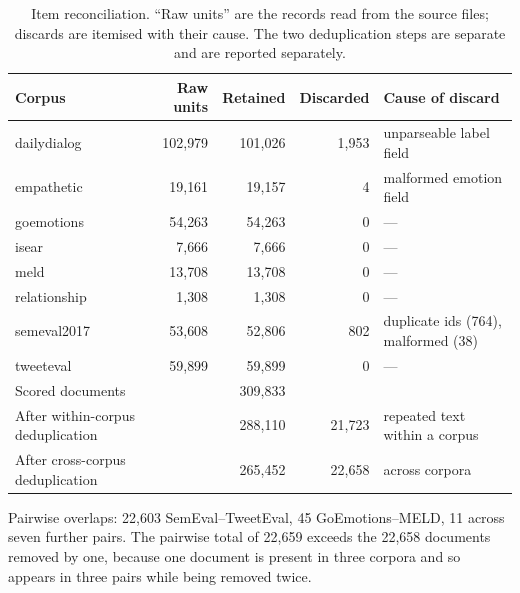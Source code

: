 \documentclass[fleqn,10pt]{wlscirep}
\providecommand{\botrule}{\bottomrule}
\begin{document}
\begin{table}[ht]
\centering
\small
\caption{Item reconciliation. ``Raw units'' are the records read from the source files; discards are itemised with their cause. The two deduplication steps are separate and are reported separately.}
\label{tab:reconcile}
\begin{threeparttable}
\begin{tabular}{lrrrl}
\toprule
Corpus & Raw units & Retained & Discarded & Cause of discard \\
\midrule
dailydialog  & 102{,}979 & 101{,}026 & 1{,}953 & unparseable label field \\
empathetic   & 19{,}161  & 19{,}157  & 4   & malformed emotion field \\
goemotions   & 54{,}263  & 54{,}263  & 0   & --- \\
isear        & 7{,}666   & 7{,}666   & 0   & --- \\
meld         & 13{,}708  & 13{,}708  & 0   & --- \\
relationship & 1{,}308   & 1{,}308   & 0   & --- \\
semeval2017  & 53{,}608  & 52{,}806  & 802 & duplicate ids (764), malformed (38) \\
tweeteval    & 59{,}899  & 59{,}899  & 0   & --- \\
\midrule
Scored documents & & 309{,}833 & & \\
After within-corpus deduplication & & 288{,}110 & 21{,}723 & repeated text within a corpus \\
After cross-corpus deduplication & & 265{,}452 & 22{,}658 & across corpora\tnote{a} \\
\botrule
\end{tabular}
\begin{tablenotes}\footnotesize
\item[a] Pairwise overlaps: 22{,}603 SemEval--TweetEval, 45 GoEmotions--MELD, 11 across seven further pairs. The pairwise total of 22{,}659 exceeds the 22{,}658 documents removed by one, because one document is present in three corpora and so appears in three pairs while being removed twice.
\end{tablenotes}
\end{threeparttable}
\end{table}
\end{document}
